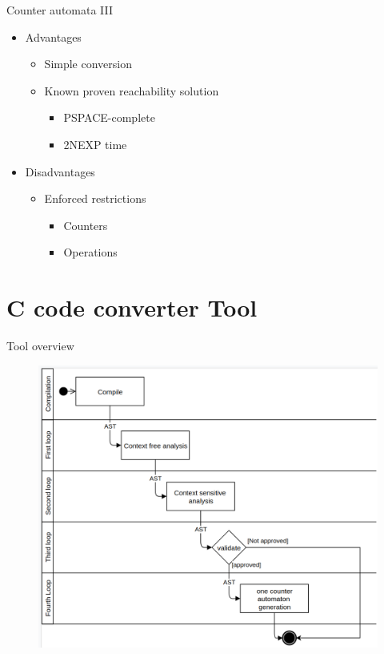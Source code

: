 \documentclass[10pt]{beamer}
\begin{document}
\begin{frame}{Counter automata III}
	\begin{itemize}
		\item Advantages
		\begin{itemize}
			\item Simple conversion
			\item Known proven reachability solution
			\begin{itemize}
				\item PSPACE-complete
				\item 2NEXP time
			\end{itemize}
		\end{itemize}
		\item Disadvantages
		\begin{itemize}
			\item Enforced restrictions
			\begin{itemize}
				\item Counters
				\item Operations
			\end{itemize}
		\end{itemize}
	\end{itemize}
\end{frame}

\section{C code converter Tool}

\begin{frame}{Tool overview}
	\begin{figure}[h]
		\centering
		\includegraphics[width=0.75\linewidth]{Images/tool_overview.png}
	\end{figure}
\end{frame}
\end{document}
